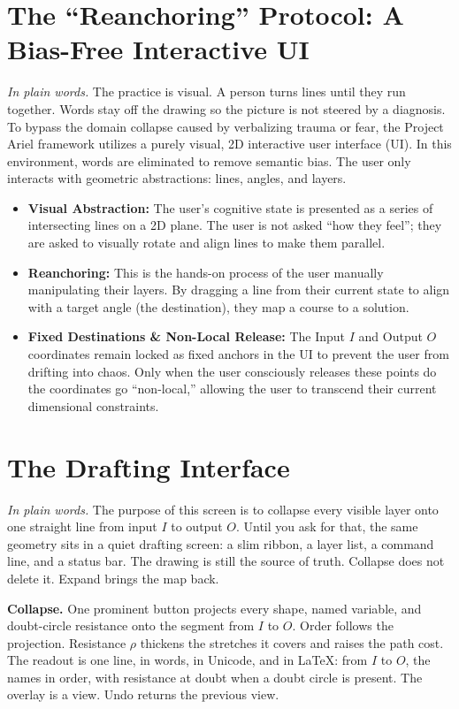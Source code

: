 \documentclass[11pt]{article}
\begin{document}
\section{The ``Reanchoring'' Protocol: A Bias-Free Interactive UI}
\textit{In plain words.} The practice is visual. A person turns lines until they run together. Words stay off the drawing so the picture is not steered by a diagnosis.
To bypass the domain collapse caused by verbalizing trauma or fear, the Project Ariel framework utilizes a purely visual, 2D interactive user interface (UI). In this environment, words are eliminated to remove semantic bias. The user only interacts with geometric abstractions: lines, angles, and layers.
\begin{itemize}[leftmargin=1.2em]
\item \textbf{Visual Abstraction:} The user's cognitive state is presented as a series of intersecting lines on a 2D plane. The user is not asked ``how they feel''; they are asked to visually rotate and align lines to make them parallel.
\item \textbf{Reanchoring:} This is the hands-on process of the user manually manipulating their layers. By dragging a line from their current state to align with a target angle (the destination), they map a course to a solution.
\item \textbf{Fixed Destinations \& Non-Local Release:} The Input $I$ and Output $O$ coordinates remain locked as fixed anchors in the UI to prevent the user from drifting into chaos. Only when the user consciously releases these points do the coordinates go ``non-local,'' allowing the user to transcend their current dimensional constraints.
\end{itemize}

\section{The Drafting Interface}
\textit{In plain words.} The purpose of this screen is to collapse every visible layer onto one straight line from input \(I\) to output \(O\). Until you ask for that, the same geometry sits in a quiet drafting screen: a slim ribbon, a layer list, a command line, and a status bar. The drawing is still the source of truth. Collapse does not delete it. Expand brings the map back.

\textbf{Collapse.} One prominent button projects every shape, named variable, and doubt-circle resistance onto the segment from \(I\) to \(O\). Order follows the projection. Resistance \(\rho\) thickens the stretches it covers and raises the path cost. The readout is one line, in words, in Unicode, and in LaTeX: from \(I\) to \(O\), the names in order, with resistance at doubt when a doubt circle is present. The overlay is a view. Undo returns the previous view.
\end{document}

